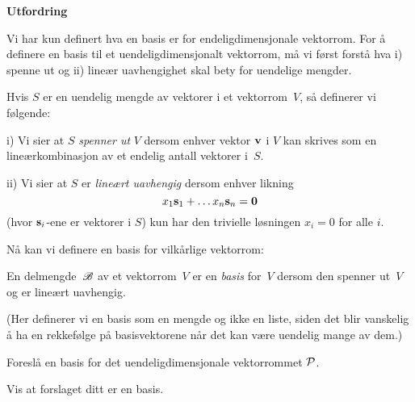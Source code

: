 \begin{oppgave} \textbf{Utfordring}

\noindent
Vi har kun definert hva en basis er for endeligdimensjonale
vektorrom. For å definere en basis til et
uendeligdimensjonalt vektorrom, må vi først forstå hva i) spenne ut
og ii) lineær uavhengighet skal bety for uendelige mengder.

\smallskip
\noindent
Hvis $S$ er en uendelig mengde av vektorer i et vektorrom~$V$,
så definerer vi følgende:

\noindent
i) Vi sier at $S$ \emph{spenner ut} $V$ dersom enhver vektor $\V{v}$ i
$V$ kan skrives som en lineærkombinasjon av et endelig antall vektorer
i~$S$.

\noindent
ii) Vi sier at $S$ er \emph{lineært uavhengig} dersom enhver
likning
\[
x_1\V{s}_1+\dots x_n\V{s}_n=\V{0}
\]
(hvor $\V{s}_i$-ene er vektorer i $S$) kun har den trivielle løsningen
$x_i=0$ for alle $i$.

\smallskip
\noindent
Nå kan vi definere en basis for vilkårlige vektorrom:

\noindent
En delmengde~$\B$ av et vektorrom~$V$ er en \emph{basis} for~$V$
dersom den spenner ut~$V$ og er lineært uavhengig.

\smallskip\noindent
(Her definerer vi en basis som en mengde og ikke en liste,
siden det blir vanskelig å ha en rekkefølge på basisvektorene
når det kan være uendelig mange av dem.)


\begin{punkt}
Foreslå en basis for det uendeligdimensjonale vektorrommet $\P$.
\end{punkt}

\begin{punkt}
Vis at forslaget ditt er en basis.
\end{punkt}

\end{oppgave}


